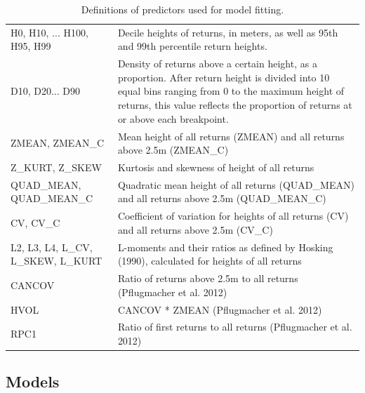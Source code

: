\documentclass[review]{elsarticle} %
\begin{document}
\begin{table}

\caption{\label{tab:predictors}Definitions of predictors used for model fitting.}
\centering
\begin{tabular}[t]{>{\raggedright\arraybackslash}p{10em}>{\raggedright\arraybackslash}p{22em}}
\toprule
\multicolumn{1}{c}{Predictor} & \multicolumn{1}{c}{Definition}\\
\midrule
H0, H10, ... H100, H95, H99 & Decile heights of returns, in meters, as well as 95th and 99th percentile return heights.\\
\addlinespace
D10, D20... D90 & Density of returns above a certain height, as a proportion. After return height is divided into 10 equal bins ranging from 0 to the maximum height of returns, this value reflects the proportion of returns at or above each breakpoint.\\
\addlinespace
ZMEAN, ZMEAN\_C & Mean height of all returns (ZMEAN) and all returns above 2.5m (ZMEAN\_C)\\
\addlinespace
Z\_KURT, Z\_SKEW & Kurtosis and skewness of height of all returns\\
\addlinespace
QUAD\_MEAN, QUAD\_MEAN\_C & Quadratic mean height of all returns (QUAD\_MEAN) and all returns above 2.5m (QUAD\_MEAN\_C)\\
\addlinespace
CV, CV\_C & Coefficient of variation for heights of all returns (CV) and all returns above 2.5m (CV\_C)\\
\addlinespace
L2, L3, L4, L\_CV, L\_SKEW, L\_KURT & L-moments and their ratios as defined by Hosking (1990), calculated for heights of all returns\\
\addlinespace
CANCOV & Ratio of returns above 2.5m to all returns (Pflugmacher et al. 2012)\\
\addlinespace
HVOL & CANCOV * ZMEAN (Pflugmacher et al. 2012)\\
\addlinespace
RPC1 & Ratio of first returns to all returns (Pflugmacher et al. 2012)\\
\bottomrule
\end{tabular}
\end{table}

\hypertarget{models}{%
\subsection{Models}\label{models}}
\end{document}
